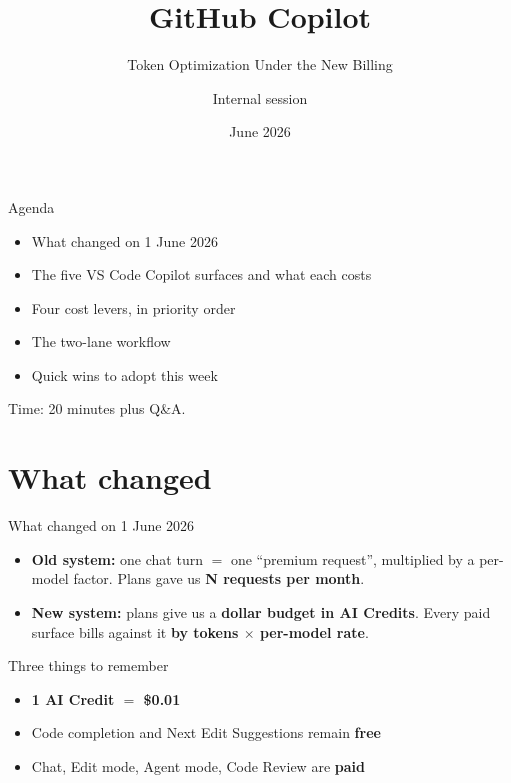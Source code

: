 \documentclass[11pt,aspectratio=169]{beamer}
\title{GitHub Copilot}
\subtitle{Token Optimization Under the New Billing}
\author{Internal session}
\institute{Office training pack}
\date{June 2026}
\newcommand{\hl}[1]{\textbf{\textcolor{accentblue}{#1}}}
\begin{document}
\maketitle

\begin{frame}{Agenda}
  \begin{itemize}
    \item What changed on 1 June 2026
    \item The five VS Code Copilot surfaces and what each costs
    \item Four cost levers, in priority order
    \item The two-lane workflow
    \item Quick wins to adopt this week
  \end{itemize}
  \vfill
  \small Time: 20 minutes plus Q\&A.
\end{frame}

\section{What changed}

\begin{frame}{What changed on 1 June 2026}
  \begin{itemize}
    \item \textbf{Old system:} one chat turn $=$ one ``premium request'', multiplied by a per-model factor. Plans gave us \hl{N requests per month}.
    \item \textbf{New system:} plans give us a \hl{dollar budget in AI Credits}. Every paid surface bills against it \hl{by tokens $\times$ per-model rate}.
  \end{itemize}
  \vfill
  \begin{block}{Three things to remember}
    \begin{itemize}
      \item \hl{1 AI Credit $=$ \$0.01}
      \item Code completion and Next Edit Suggestions remain \hl{free}
      \item Chat, Edit mode, Agent mode, Code Review are \hl{paid}
    \end{itemize}
  \end{block}
\end{frame}
\end{document}
